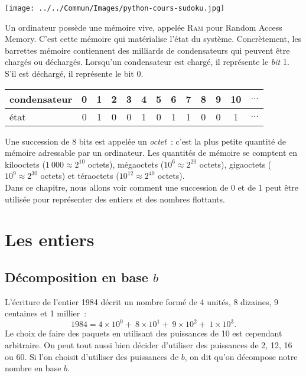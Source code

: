 \documentclass{magnolia}
\begin{document}
\hfill\texttt{[image: ../../Commun/Images/python-cours-sudoku.jpg]}
\magtoc


\vspace{2ex}
Un ordinateur possède une mémoire vive, appelée \textsc{Ram} pour \og Random Access
Memory\fg. C'est cette mémoire qui matérialise l'état du système. Concrètement, les
barrettes mémoire contiennent des milliards de condensateurs qui peuvent être
chargés ou déchargés. Lorsqu'un condensateur est chargé, il représente le \emph{bit} 1. S'il est déchargé,
il représente le bit 0.

\begin{center}
\begin{tabular}{|l||c|c|c|c|c|c|c|c|c|c|c|c|}
\hline
condensateur & 0 & 1 & 2 & 3 & 4 & 5 & 6 & 7 & 8 & 9 & 10 & $\ldots$ \\
\hline
état & 0 & 1 & 0 & 0 & 1 & 0 & 1 & 1 & 0 & 0 & 1 & $\ldots$ \\
\hline
\end{tabular}
\end{center}
\noindent
Une succession de 8 bits est appelée un \emph{octet}~: c'est la plus petite quantité
de mémoire adressable par un ordinateur. Les quantités de mémoire se comptent
en kilooctets ($1\ 000\approx 2^{10}$ octets), mégaoctets ($10^6\approx 2^{20}$ octets),
gigaoctets ($10^9\approx 2^{30}$ octets) et téraoctets ($10^{12}\approx 2^{40}$ octets).\\

Dans ce chapitre, nous allons voir comment une succession de 0 et de 1 peut être
utilisée pour représenter des entiers et des nombres flottants.

\section{Les entiers}

\subsection{Décomposition en base $b$}

L'écriture de l'entier 1984 décrit un nombre formé de 4 unités, 8 dizaines, 9 centaines
et 1 millier~:
\[1984 = 4\times 10^0 +\ 8\times 10^1 + \ 9 \times 10^2 + \ 1\times 10^3.\]
Le choix de faire des paquets en utilisant des puissances de 10 est cependant arbitraire.
On peut tout aussi bien décider d'utiliser des puissances de 2, 12, 16 ou 60. Si l'on choisit
d'utiliser des puissances de $b$, on dit qu'on décompose notre nombre en base $b$.
\end{document}
